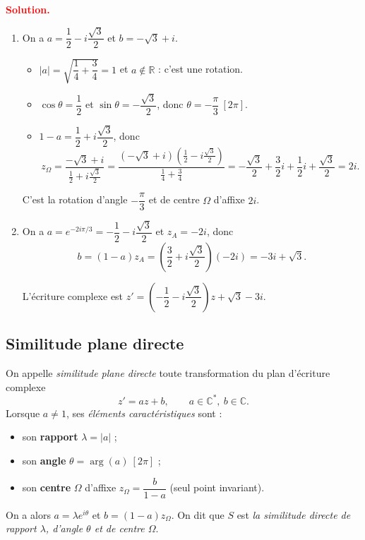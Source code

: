 \documentclass[12pt,a4paper]{article}
\newcommand{\C}{\mathbb{C}}
\newcommand{\R}{\mathbb{R}}
\newcommand{\zO}{z_{\Omega}}
\newcommand{\arge}{\operatorname{arg}}
\newcommand{\solution}{\par\smallskip\noindent\textbf{\textcolor{red}{Solution.}}\par}
\begin{document}
\solution
\begin{enumerate}
  \item On a $a=\dfrac12-i\dfrac{\sqrt3}{2}$ et $b=-\sqrt3+i$.
  \begin{itemize}
    \item $|a|=\sqrt{\dfrac14+\dfrac34}=1$ et $a\notin\R$ : c'est une rotation.
    \item $\cos\theta=\dfrac12$ et $\sin\theta=-\dfrac{\sqrt3}{2}$, donc $\theta=-\dfrac{\pi}{3}\ [2\pi]$.
    \item $1-a=\dfrac12+i\dfrac{\sqrt3}{2}$, donc
    \[
    \zO=\frac{-\sqrt3+i}{\frac12+i\frac{\sqrt3}{2}}
    =\frac{(-\sqrt3+i)\left(\frac12-i\frac{\sqrt3}{2}\right)}{\frac14+\frac34}
    =-\frac{\sqrt3}{2}+\frac32 i+\frac12 i+\frac{\sqrt3}{2}=2i .
    \]
  \end{itemize}
  \begin{resultat}
  C'est la rotation d'angle $-\dfrac{\pi}{3}$ et de centre $\Omega$ d'affixe $2i$.
  \end{resultat}
  \item On a $a=e^{-2i\pi/3}=-\dfrac12-i\dfrac{\sqrt3}{2}$ et $z_A=-2i$, donc
  \[
  b=(1-a)z_A=\left(\frac32+i\frac{\sqrt3}{2}\right)(-2i)=-3i+\sqrt3 .
  \]
  \begin{resultat}
  L'écriture complexe est $z'=\left(-\dfrac12-i\dfrac{\sqrt3}{2}\right)z+\sqrt3-3i$.
  \end{resultat}
\end{enumerate}

\subsection{Similitude plane directe}

\begin{defi}
On appelle \emph{similitude plane directe} toute transformation du plan d'écriture complexe
\[
z'=az+b,\qquad a\in\C^{*},\ b\in\C .
\]
Lorsque $a\neq1$, ses \emph{éléments caractéristiques} sont :
\begin{itemize}
  \item son \textbf{rapport} $\lambda=|a|$ ;
  \item son \textbf{angle} $\theta=\arge(a)\ [2\pi]$ ;
  \item son \textbf{centre} $\Omega$ d'affixe $\zO=\dfrac{b}{1-a}$ (seul point invariant).
\end{itemize}
On a alors $a=\lambda e^{i\theta}$ et $b=(1-a)\zO$. On dit que $S$ est \emph{la similitude directe de rapport $\lambda$, d'angle $\theta$ et de centre $\Omega$}.
\end{defi}
\end{document}
